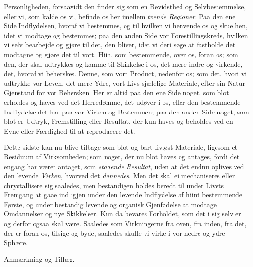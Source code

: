 \documentclass[12pt,a4paper]{book}
\newcommand{\apage}[1]{\marginnote{\footnotesize\textit{[#1]}}}
\begin{document}
Personligheden, forsaavidt den finder sig som en Bevidsthed og Selvbestemmelse,
eller vi, som kalde os vi, befinde os her imellem \emph{tvende Regioner}. Paa
den ene Side Indflydelsen, hvoraf vi bestemmes, og til hvilken vi henvende os og
skue hen, idet vi modtage og bestemmes; paa den anden Side vor
Forestillingskreds, hvilken vi selv bearbejde og gjøre til det, den bliver, idet
vi deri søge at fastholde det modtagne og gjøre det til vort. Hiin, som
bestemmende, over os, foran os; som den, der skal udtrykkes og komme til
Skikkelse i os, det mere indre og virkende, det, hvoraf vi beherskes. Denne, som
vort Product, nedenfor os; som det, hvori vi udtrykke vor Leven, det mere Ydre,
vort Livs sjælelige Materiale, efter sin Natur Gjenstand for vor Behersken. Her
er altid paa den ene Side noget, som blot erholdes og haves ved det Herredømme,
det udøver i os, eller den bestemmende Indflydelse det har paa vor Virken og
Bestemmen; paa den anden Side noget, som blot er Udtryk, Fremstilling eller
Resultat, der kun haves og beholdes ved en Evne eller Færdighed til at
reproducere det.

Dette sidste kan nu blive tilbage som blot og bart livløst Materiale, ligesom et
Residuum af \apage{26} Virksomheden; som noget, der nu blot haves og antages, fordi det
engang har været antaget, som \emph{staaende Resultat}, uden at det endnu oplives
ved den levende \emph{Virken}, hvorved det \emph{dannedes}. Men det skal ei mechaniseres
eller chrystallisere sig saaledes, men bestandigen holdes beredt til under Livets
Fremgang at gaae ind igjen under den levende Indflydelse af hiint bestemmende
Første, og under bestandig levende og organisk Gjenfødelse at modtage
Omdannelser og nye Skikkelser. Kun da bevares Forholdet, som det i sig selv er
og derfor ogsaa skal være. Saaledes som Virkningerne fra oven, fra inden, fra
det, der er foran os, tilsige og byde, saaledes skulle vi virke i vor nedre og
ydre Sphære.

\begin{center}Anmærkning og Tillæg.\end{center}
\end{document}

